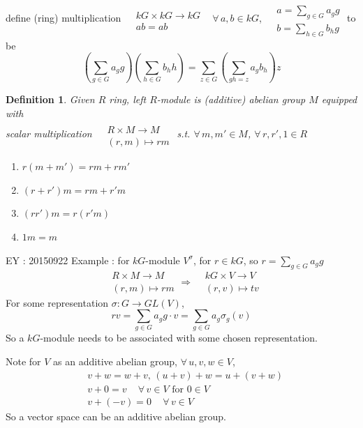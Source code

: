 \documentclass[10pt]{amsart}
\newtheorem{definition}{Definition}
\begin{document}
\begin{multicols*}{2}
\begin{enumerate}
	define (ring) multiplication $\begin{aligned} & \quad \\ 
	& kG \times kG \to kG \\
	& ab = ab \end{aligned}$ \, $\forall \, a,b \in kG$, $\begin{aligned} & \quad \\ 
	& a = \sum_{g\in G} a_g g \\
	& b = \sum_{h \in G} b_h g \end{aligned}$ to be 
	\[
	\left( \sum_{g \in G} a_g g \right) \left( \sum_{h \in G} b_h h \right) = \sum_{ z\in G} \left( \sum_{ gh = z} a_g b_h \right)z
	\]
	
\end{enumerate}

\begin{definition}
	Given $R$ ring, left $R$-module is (additive) abelian group $M$ equipped with \\
	scalar multiplication $\begin{aligned} & \quad \\
	& R \times M \to M \\
	& (r,m) \mapsto rm \end{aligned}$ s.t. $\forall \, m , m' \in M$, $\forall \, r, r' , 1 \in R$
	\begin{enumerate}
		\item[(i)] $r (m+m') = rm + rm' $ 
		\item[(ii)] $(r+r')m = rm + r'm $ 
		\item[(iii)] $(rr')m = r(r'm)$
		\item[(iv)] $1m = m$
	\end{enumerate}
\end{definition}

EY : 20150922 Example : for $kG$-module $V^{\sigma}$, for $r \in kG$, so $r= \sum_{g\in G} a_g g$ 
\[
\begin{aligned} & R \times M \to M \\
& (r,m) \mapsto rm \end{aligned} \Longrightarrow \begin{aligned} & kG \times V \to V \\
& (r,v) \mapsto tv \end{aligned}
\]
For some representation $\sigma : G \to GL(V)$, 
\[
rv = \sum_{g \in G} a_g g \cdot v =\sum_{g\in G} a_g \sigma_g(v)
\]
So a $kG$-module needs to be associated with some chosen representation.  

Note for $V$ as an additive abelian group, $\forall \, u,v,w \in V$, 
\[
\begin{aligned}
& v+w = w+v, \, (u+v) + w = u+(v+w) \\ 
& v+0 = v \quad \, \forall \, v \in V \text{ for } 0 \in V \\ 
& v+ (-v) =0 \quad \, \forall \, v \in V
\end{aligned}
\]
So a vector space can be an additive abelian group.  


\end{multicols*}
\end{document}
